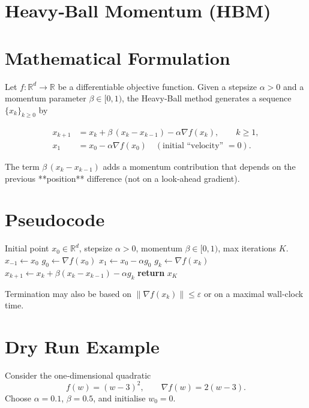 \documentclass{article}
\newcommand{\norm}[1]{\left\lVert#1\right\rVert}
\newcommand{\R}{\mathbb{R}}
\begin{document}
\section*{Heavy‑Ball Momentum (HBM)}

\section*{Mathematical Formulation}
Let $f:\R^{d}\to\R$ be a differentiable objective function.  
Given a stepsize $\alpha>0$ and a momentum parameter $\beta\in[0,1)$, the Heavy‑Ball method generates a sequence $\{x_k\}_{k\ge 0}$ by  

\[
\boxed{
\begin{aligned}
x_{k+1}&=x_k+\beta\,(x_k-x_{k-1})-\alpha \nabla f(x_k),\qquad k\ge 1,\\
x_1&=x_0-\alpha \nabla f(x_0) \quad(\text{initial ``velocity'' }=0).
\end{aligned}}
\]

The term $\beta\,(x_k-x_{k-1})$ adds a momentum contribution that depends on the previous **position** difference (not on a look‑ahead gradient).  

\section*{Pseudocode}
\begin{algorithm}[H]
\caption{Heavy‑Ball Momentum}
\begin{algorithmic}[1]
\Require Initial point $x_0\in\R^{d}$, stepsize $\alpha>0$, momentum $\beta\in[0,1)$, max iterations $K$.
\State $x_{-1}\gets x_0$ 
\State $g_0 \gets \nabla f(x_0)$
\State $x_1 \gets x_0 - \alpha g_0$ 
    \State $g_k \gets \nabla f(x_k)$
    \State $x_{k+1} \gets x_k + \beta (x_k-x_{k-1}) - \alpha g_k$
\EndFor
\State \textbf{return} $x_{K}$
\end{algorithmic}
\end{algorithm}
Termination may also be based on $\norm{\nabla f(x_k)}\le\varepsilon$ or on a maximal wall‑clock time.

\section*{Dry Run Example}
Consider the one‑dimensional quadratic
\[
f(w)=(w-3)^2,\qquad \nabla f(w)=2(w-3).
\]
Choose $\alpha=0.1$, $\beta=0.5$, and initialise $w_0=0$.
\end{document}
